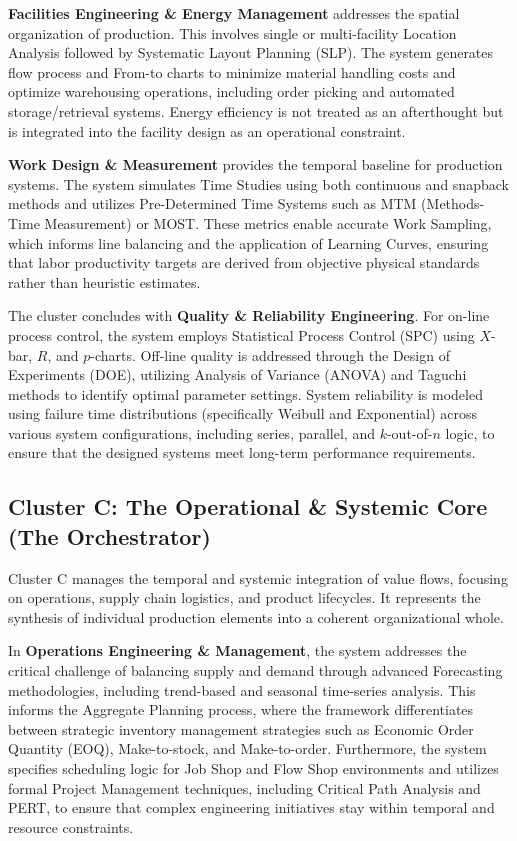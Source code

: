 \documentclass[12pt,a4paper]{article}
\begin{document}
\textbf{Facilities Engineering \& Energy Management} addresses the spatial organization of production. This involves single or multi-facility Location Analysis followed by Systematic Layout Planning (SLP). The system generates flow process and From-to charts to minimize material handling costs and optimize warehousing operations, including order picking and automated storage/retrieval systems. Energy efficiency is not treated as an afterthought but is integrated into the facility design as an operational constraint.

\textbf{Work Design \& Measurement} provides the temporal baseline for production systems. The system simulates Time Studies using both continuous and snapback methods and utilizes Pre-Determined Time Systems such as MTM (Methods-Time Measurement) or MOST. These metrics enable accurate Work Sampling, which informs line balancing and the application of Learning Curves, ensuring that labor productivity targets are derived from objective physical standards rather than heuristic estimates.

The cluster concludes with \textbf{Quality \& Reliability Engineering}. For on-line process control, the system employs Statistical Process Control (SPC) using $X$-bar, $R$, and $p$-charts. Off-line quality is addressed through the Design of Experiments (DOE), utilizing Analysis of Variance (ANOVA) and Taguchi methods to identify optimal parameter settings. System reliability is modeled using failure time distributions (specifically Weibull and Exponential) across various system configurations, including series, parallel, and $k$-out-of-$n$ logic, to ensure that the designed systems meet long-term performance requirements.

\subsection{Cluster C: The Operational \& Systemic Core (The Orchestrator)}

Cluster C manages the temporal and systemic integration of value flows, focusing on operations, supply chain logistics, and product lifecycles. It represents the synthesis of individual production elements into a coherent organizational whole.

In \textbf{Operations Engineering \& Management}, the system addresses the critical challenge of balancing supply and demand through advanced Forecasting methodologies, including trend-based and seasonal time-series analysis. This informs the Aggregate Planning process, where the framework differentiates between strategic inventory management strategies such as Economic Order Quantity (EOQ), Make-to-stock, and Make-to-order. Furthermore, the system specifies scheduling logic for Job Shop and Flow Shop environments and utilizes formal Project Management techniques, including Critical Path Analysis and PERT, to ensure that complex engineering initiatives stay within temporal and resource constraints.
\end{document}
